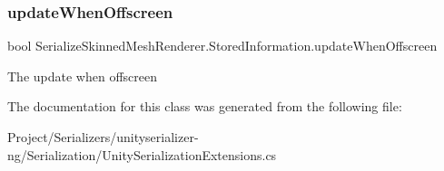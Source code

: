 \subsubsection{\texorpdfstring{update\+When\+Offscreen}{updateWhenOffscreen}}
{\footnotesize\ttfamily bool Serialize\+Skinned\+Mesh\+Renderer.\+Stored\+Information.\+update\+When\+Offscreen}



The update when offscreen 



The documentation for this class was generated from the following file\+:\begin{DoxyCompactItemize}
\item 
Project/\+Serializers/unityserializer-\/ng/\+Serialization/Unity\+Serialization\+Extensions.\+cs\end{DoxyCompactItemize}

